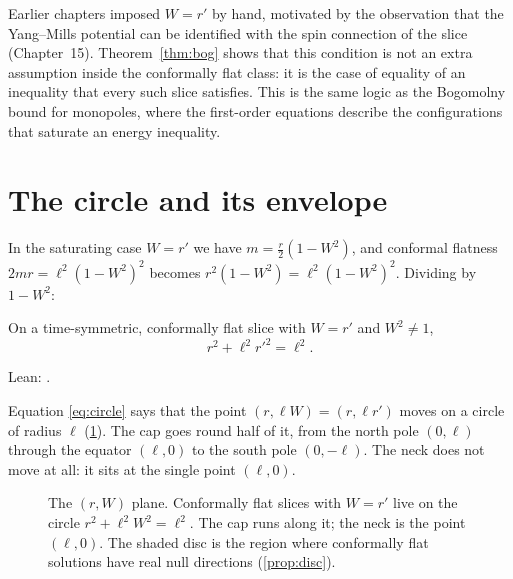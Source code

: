 \begin{remark}
Earlier chapters imposed $W=r'$ by hand, motivated by the observation that the Yang--Mills potential can be identified with the spin connection of the slice (Chapter~15). Theorem~\ref{thm:bog} shows that this condition is not an extra assumption inside the conformally flat class: it is the case of equality of an inequality that every such slice satisfies. This is the same logic as the Bogomolny bound for monopoles, where the first-order equations describe the configurations that saturate an energy inequality.
\end{remark}

\section{The circle and its envelope}

In the saturating case $W=r'$ we have $m=\tfrac r2(1-W^2)$, and conformal flatness $2mr=\ell^2(1-W^2)^2$ becomes $r^2(1-W^2)=\ell^2(1-W^2)^2$. Dividing by $1-W^2$:

\begin{theorem}\proved\label{thm:circle}
On a time-symmetric, conformally flat slice with $W=r'$ and $W^2\ne1$,
\begin{equation}\label{eq:circle}
r^2+\ell^2r'^2=\ell^2 .
\end{equation}
\end{theorem}
\noindent Lean: .

Equation \eqref{eq:circle} says that the point $(r,\ell W)=(r,\ell r')$ moves on a circle of radius $\ell$ (\cref{fig:circle}). The cap goes round half of it, from the north pole $(0,\ell)$ through the equator $(\ell,0)$ to the south pole $(0,-\ell)$. The neck does not move at all: it sits at the single point $(\ell,0)$.

\begin{figure}[h]
\centering
{}
\caption{The $(r,W)$ plane. Conformally flat slices with $W=r'$ live on the circle $r^2+\ell^2W^2=\ell^2$. The cap runs along it; the neck is the point $(\ell,0)$. The shaded disc is the region where conformally flat solutions have real null directions (\cref{prop:disc}).}
\label{fig:circle}
\end{figure}


